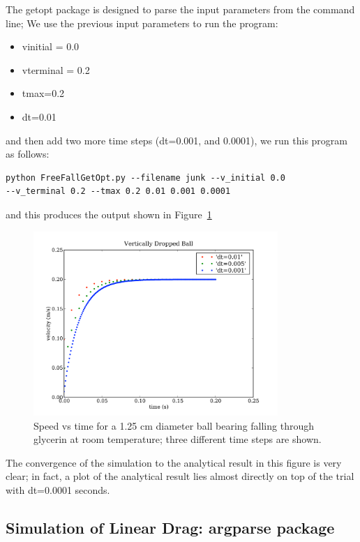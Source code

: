 The \textsf{getopt} package is designed to parse the input parameters from the command line; 
We use the previous input parameters to run the program: 
\begin{itemize}
	\item vinitial = 0.0
	\item vterminal = 0.2
	\item  tmax=0.2
	\item dt=0.01
\end{itemize}
and then add two more time steps (dt=0.001, and 0.0001), we run this program as follows:\\
\begin{verbatim}
python FreeFallGetOpt.py --filename junk --v_initial 0.0
--v_terminal 0.2 --tmax 0.2 0.01 0.001 0.0001
\end{verbatim}
and this produces the output shown in Figure~\ref{fig:freefallgetopt}
\begin{figure}[b]
\centering
\includegraphics[height=7cm]{Figures/5Kinematics/getopt.pdf}
\caption{Speed vs time for a 1.25 cm diameter ball bearing falling through glycerin at room temperature; three different time steps are shown.}
\label{fig:freefallgetopt}       %
\end{figure}
The convergence of the simulation to the analytical result in this figure is very clear; in fact, a plot of the analytical result lies almost directly on top of the trial with dt=0.0001 seconds. 

\pagebreak
\subsection{Simulation of Linear Drag: \textsf{argparse} package}
\label{sec-LinDragArgParse}





